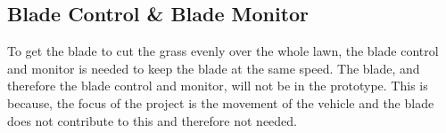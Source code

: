 \subsection{Blade Control \& Blade Monitor}
To get the blade to cut the grass evenly over the whole lawn, the blade control and monitor is needed to keep the blade at the same speed.
The blade, and therefore the blade control and monitor, will not be in the prototype. This is because, the focus of the project is the movement of the vehicle and the blade does not contribute to this and therefore not needed.
